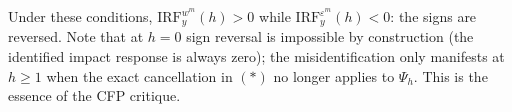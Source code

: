 \documentclass[12pt]{article}
\theoremstyle{definition}
\begin{document}
\noindent Under these conditions, $\text{IRF}_y^{w^m}(h) > 0$ while $\text{IRF}_y^{\varepsilon^m}(h) < 0$: the signs are reversed. Note that at $h=0$ sign reversal is impossible by construction (the identified impact response is always zero); the misidentification only manifests at $h\geq 1$ when the exact cancellation in $(*)$ no longer applies to $\Psi_h$. This is the essence of the CFP critique.

\fi
\end{document}
